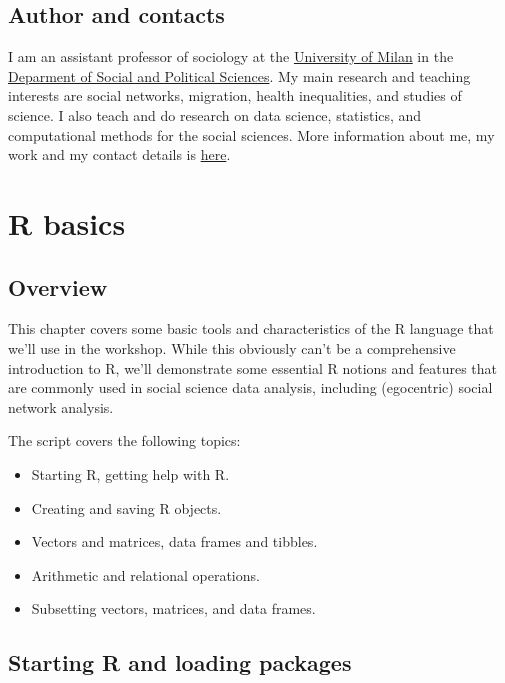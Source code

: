 \documentclass[
]{book}
\providecommand{\tightlist}{%
  \setlength{\itemsep}{0pt}\setlength{\parskip}{0pt}}
\begin{document}
\hypertarget{author-and-contacts}{%
\section{Author and contacts}\label{author-and-contacts}}

I am an assistant professor of sociology at the \href{https://www.unimi.it/en}{University of Milan} in the \href{http://eng.sps.unimi.it/ecm/home}{Deparment of Social and Political Sciences}. My main research and teaching interests are social networks, migration, health inequalities, and studies of science. I also teach and do research on data science, statistics, and computational methods for the social sciences. More information about me, my work and my contact details is \href{http://www.raffaelevacca.com/about-me/}{here}.

\hypertarget{basics}{%
\chapter{R basics}\label{basics}}

\hypertarget{overview}{%
\section{Overview}\label{overview}}

This chapter covers some basic tools and characteristics of the R language that we'll use in the workshop. While this obviously can't be a comprehensive introduction to R, we'll demonstrate some essential R notions and features that are commonly used in social science data analysis, including (egocentric) social network analysis.

The script covers the following topics:

\begin{itemize}
\tightlist
\item
  Starting R, getting help with R.
\item
  Creating and saving R objects.
\item
  Vectors and matrices, data frames and tibbles.
\item
  Arithmetic and relational operations.
\item
  Subsetting vectors, matrices, and data frames.
\end{itemize}

\hypertarget{starting-R-and-loading-packages}{%
\section{Starting R and loading packages}\label{starting-R-and-loading-packages}}
\end{document}

